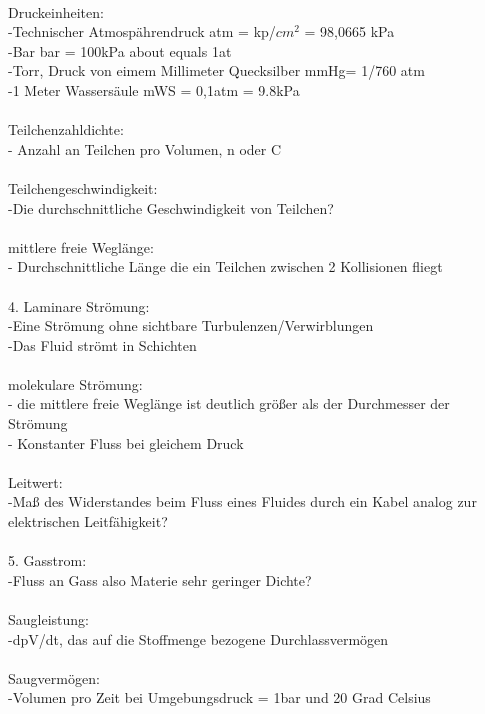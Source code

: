 \\
	   Druckeinheiten:\\
	   	-Technischer Atmospährendruck atm = kp/$cm^2$ = 98,0665 kPa \\
		-Bar bar = 100kPa about equals 1at\\
		-Torr, Druck von eimem Millimeter Quecksilber mmHg= 1/760 atm\\
		-1 Meter Wassersäule mWS = 0,1atm = 9.8kPa\\
\\
	   Teilchenzahldichte:\\
	   	- Anzahl an Teilchen pro Volumen, n oder C\\
\\
	   Teilchengeschwindigkeit:\\
		-Die durchschnittliche Geschwindigkeit von Teilchen?\\
\\
	   mittlere freie Weglänge:\\
	   	- Durchschnittliche Länge die ein Teilchen zwischen 2 Kollisionen fliegt\\
\\
	4. Laminare Strömung:\\
		-Eine Strömung ohne sichtbare Turbulenzen/Verwirblungen\\
		-Das Fluid strömt in Schichten\\
\\
	   molekulare Strömung:\\
		- die mittlere freie Weglänge ist deutlich größer als der Durchmesser der Strömung\\
		- Konstanter Fluss bei gleichem Druck\\
\\
	   Leitwert:\\
		-Maß des Widerstandes beim Fluss eines Fluides durch ein Kabel analog zur elektrischen Leitfähigkeit?\\ 
\\
	5. Gasstrom: \\
		-Fluss an Gass also Materie sehr geringer Dichte?\\
\\
	   Saugleistung:\\
		-dpV/dt, das auf die Stoffmenge bezogene Durchlassvermögen\\
\\
	   Saugvermögen:\\
	   	-Volumen pro Zeit bei Umgebungsdruck = 1bar und 20 Grad Celsius\\
\\
